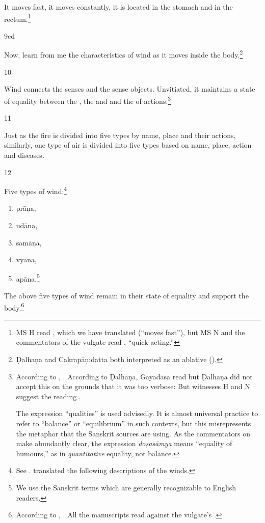 \begin{translation}
	It moves fast, it moves constantly, it is located in the stomach and in
	the rectum.\footnote{MS H read , which we have translated
	(“moves fast”), but MS N and the commentators of the vulgate read
	, “quick-acting.”}

\item[9cd]

	Now, learn from me the characteristics of wind as it moves inside the
	body.\footnote{Ḍalhaṇa and Cakrapāṇidatta both interpreted  as
	an ablative ().}

\item[10] 

	Wind connects the senses and the sense objects.  Unvitiated, it
	maintains a state of equality between the , the
	 and  and the
	 of actions.\footnote{According to
	, .  According to Ḍalhaṇa,
	Gayadāsa read  but Ḍalhaṇa did not accept
	this on the grounds that it was too verbose:  But witnesses H and N suggest the reading
	.  
    
	The expression “qualities” is used advisedly. It is almost universal
	practice to refer to “balance” or “equilibrium” in such contexts, but
	this misrepresents the metaphor that the Sanskrit sources are using. As
	the commentators on \AH\  make abundantly clear, the
	expression \emph{doṣasāmya} means “equality of humours,” as in
	\emph{quantitative} equality, not balance.}

\item[11] 

	Just as the fire is divided into five types by name, place and their
	actions, similarly, one type of air is divided into five types based on
	name, place, action and diseases.

\item[12] 

Five types of wind:\footnote{See \cite{zysk-1993}.  \citet[S110]{zysk-2007}
translated the following descriptions of the winds.} \begin{enumerate} \item
		prāṇa, \item udāna, \item
			samāna, \item
vyāna, \item apāna.\footnote{We use the
Sanskrit terms which are generally recognizable to English readers.}
\end{enumerate} The above five types of wind remain in their state of equality
and support the body.\footnote{According to ,
. All the manuscripts read
  against the vulgate's
.}




\end{translation}
